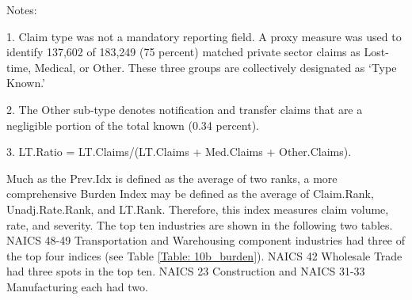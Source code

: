 \documentclass[9pt, oneside]{article}   	%
\begin{document}
    \begin{tablenotes}
      \small
      Notes:
      \\
            \item 1. Claim type was not a mandatory reporting field. A proxy measure was used to identify 137,602 of 183,249 (75 percent) matched private sector claims as Lost-time, Medical, or Other. These three groups are collectively designated  as  `Type Known.'  \\
            \item 2. The Other sub-type denotes notification and transfer claims that are a negligible portion of the total known (0.34 percent). \\
            \item 3. LT.Ratio = LT.Claims/(LT.Claims + Med.Claims + Other.Claims).\\

    \end{tablenotes}

\pagebreak

Much as the Prev.Idx is defined as the average of two ranks, a more comprehensive Burden Index may be defined as the average of Claim.Rank,  Unadj.Rate.Rank, and LT.Rank. Therefore, this index measures claim volume, rate, and severity. The top ten industries are shown in the following two tables. NAICS 48-49 Transportation and Warehousing component industries had three of the top four indices (see Table \ref{Table: 10b_burden}). NAICS 42 Wholesale Trade had three spots in the top ten. NAICS 23 Construction and NAICS 31-33 Manufacturing each had two.
\end{document}
